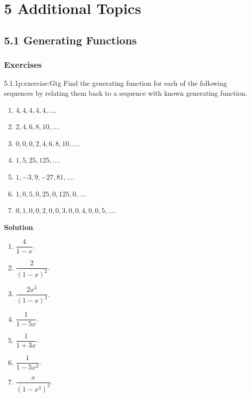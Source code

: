 \documentclass[twoside,11pt,]{book}
\newcommand{\blocktitlefont}{\relax}
\numberwithin{equation}{chapter}
\begin{document}
\chapter*{5 Additional Topics}
\section*{5.1 Generating Functions}
\subsection*{Exercises}
\begin{divisionsolution}{5.1.1}{}{p:exercise:Gtg}%
Find the generating function for each of the following sequences by relating them back to a sequence with known generating function.%
\begin{enumerate}[label=(\alph*)]
\item{}\(4,4,4,4,4,\ldots\).%
\item{}\(2, 4, 6, 8, 10, \ldots\).%
\item{}\(0,0,0,2,4,6,8,10,\ldots\).%
\item{}\(1, 5, 25, 125, \ldots\).%
\item{}\(1, -3, 9, -27, 81, \ldots\).%
\item{}\(1, 0, 5, 0, 25, 0, 125, 0, \ldots\).%
\item{}\(0, 1, 0, 0, 2, 0, 0, 3, 0, 0, 4, 0, 0, 5, \ldots\).%
\end{enumerate}
%
\par\smallskip%
\noindent\textbf{\blocktitlefont Solution}.\quad{}%
\begin{multicols}{3}
\begin{enumerate}[label=(\alph*)]
\item{}\(\dfrac{4}{1-x}\).%
\item{}\(\dfrac{2}{(1-x)^2}\).%
\item{}\(\dfrac{2x^3}{(1-x)^2}\).%
\item{}\(\dfrac{1}{1-5x}\).%
\item{}\(\dfrac{1}{1+3x}\).%
\item{}\(\dfrac{1}{1-5x^2}\).%
\item{}\(\dfrac{x}{(1-x^3)^2}\).%
\end{enumerate}
\end{multicols}
%
\end{divisionsolution}%
\end{document}
